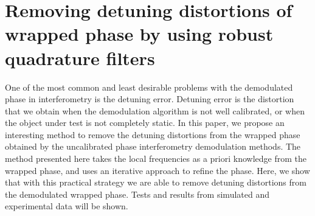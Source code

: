 \chapter{Removing detuning distortions of wrapped phase by using robust 
 quadrature filters}

One of the most common and least desirable problems with the 
demodulated phase in interferometry is the detuning error. Detuning error is 
the distortion that we obtain when the demodulation algorithm is not well 
calibrated, or when the object under test is not completely static. In this 
paper, we propose an interesting method to remove the detuning distortions from 
the wrapped phase obtained by the uncalibrated phase interferometry 
demodulation methods. The method presented here takes the local frequencies as 
a priori knowledge from the wrapped phase, and uses an iterative approach to 
refine the phase. Here, we show that with this practical strategy we are able 
to remove detuning distortions from the demodulated wrapped phase. Tests and
results from simulated and experimental data will be shown.

 



